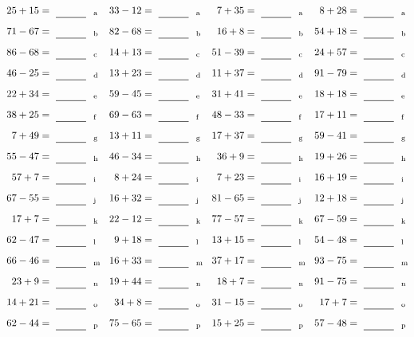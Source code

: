 \documentclass
[
  draft    = true,
  fontsize = 11pt,
  parskip  = half-
]
{scrartcl}
\begin{document}
\clearpage
\begin{align*}
    \pline{25+15}&=\rline{a}
  & \pline{33-12}&=\rline{a}
  & \pline{7+35}&=\rline{a}
  & \pline{8+28}&=\rline{a} \\[1ex]
    \pline{71-67}&=\rline{b}
  & \pline{82-68}&=\rline{b}
  & \pline{16+8}&=\rline{b}
  & \pline{54+18}&=\rline{b} \\[1ex]
    \pline{86-68}&=\rline{c}
  & \pline{14+13}&=\rline{c}
  & \pline{51-39}&=\rline{c}
  & \pline{24+57}&=\rline{c} \\[1ex]
    \pline{46-25}&=\rline{d}
  & \pline{13+23}&=\rline{d}
  & \pline{11+37}&=\rline{d}
  & \pline{91-79}&=\rline{d} \\[1ex]
    \pline{22+34}&=\rline{e}
  & \pline{59-45}&=\rline{e}
  & \pline{31+41}&=\rline{e}
  & \pline{18+18}&=\rline{e} \\[1ex]
    \pline{38+25}&=\rline{f}
  & \pline{69-63}&=\rline{f}
  & \pline{48-33}&=\rline{f}
  & \pline{17+11}&=\rline{f} \\[1ex]
    \pline{7+49}&=\rline{g}
  & \pline{13+11}&=\rline{g}
  & \pline{17+37}&=\rline{g}
  & \pline{59-41}&=\rline{g} \\[1ex]
    \pline{55-47}&=\rline{h}
  & \pline{46-34}&=\rline{h}
  & \pline{36+9}&=\rline{h}
  & \pline{19+26}&=\rline{h} \\[1ex]
    \pline{57+7}&=\rline{i}
  & \pline{8+24}&=\rline{i}
  & \pline{7+23}&=\rline{i}
  & \pline{16+19}&=\rline{i} \\[1ex]
    \pline{67-55}&=\rline{j}
  & \pline{16+32}&=\rline{j}
  & \pline{81-65}&=\rline{j}
  & \pline{12+18}&=\rline{j} \\[1ex]
    \pline{17+7}&=\rline{k}
  & \pline{22-12}&=\rline{k}
  & \pline{77-57}&=\rline{k}
  & \pline{67-59}&=\rline{k} \\[1ex]
    \pline{62-47}&=\rline{l}
  & \pline{9+18}&=\rline{l}
  & \pline{13+15}&=\rline{l}
  & \pline{54-48}&=\rline{l} \\[1ex]
    \pline{66-46}&=\rline{m}
  & \pline{16+33}&=\rline{m}
  & \pline{37+17}&=\rline{m}
  & \pline{93-75}&=\rline{m} \\[1ex]
    \pline{23+9}&=\rline{n}
  & \pline{19+44}&=\rline{n}
  & \pline{18+7}&=\rline{n}
  & \pline{91-75}&=\rline{n} \\[1ex]
    \pline{14+21}&=\rline{o}
  & \pline{34+8}&=\rline{o}
  & \pline{31-15}&=\rline{o}
  & \pline{17+7}&=\rline{o} \\[1ex]
    \pline{62-44}&=\rline{p}
  & \pline{75-65}&=\rline{p}
  & \pline{15+25}&=\rline{p}
  & \pline{57-48}&=\rline{p}
\end{align*}
\end{document}
